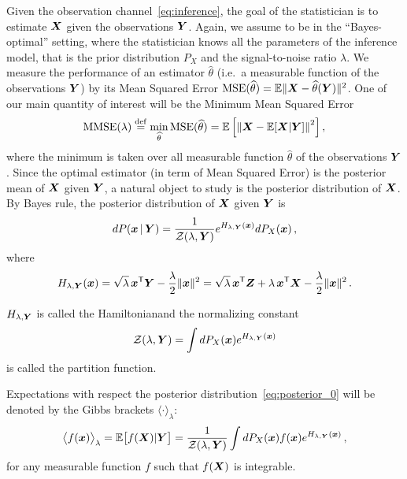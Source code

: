 \documentclass[12pt,nocut]{article}
\begin{document}
Given the observation channel~\eqref{eq:inference}, the goal of the statistician is to estimate ${\boldsymbol X}$ given the observations ${\boldsymbol Y}$. Again, we assume to be in the ``Bayes-optimal'' setting, where the statistician knows all the parameters of the inference model, that is the prior distribution $P_X$ and the signal-to-noise ratio $\lambda$. We measure the performance of an estimator $\widehat{\theta}$ (i.e.\ a measurable function of the observations ${\boldsymbol Y}$) by its Mean Squared Error ${{\rm MSE}}(\widehat{\theta}) = \mathbb{E} \| {\boldsymbol X} - \widehat{\theta}({\boldsymbol Y}) \|^2$.
One of our main quantity of interest will be the Minimum Mean Squared Error
$$
{{\rm MMSE}}(\lambda) \overset{{\rm def}}{=} \min_{\widehat{\theta}} {{\rm MSE}}(\widehat{\theta}) = \mathbb{E} \left[ \left\| {\boldsymbol X} - \mathbb{E}[{\boldsymbol X}|{\boldsymbol Y}] \right\|^2 \right],
$$
where the minimum is taken over all measurable function $\widehat{\theta}$ of the observations ${\boldsymbol Y}$.
Since the optimal estimator (in term of Mean Squared Error) is the posterior mean of ${\boldsymbol X}$ given ${\boldsymbol Y}$, a natural object to study is the posterior distribution of ${\boldsymbol X}$.
By Bayes rule, the posterior distribution of ${\boldsymbol X}$ given ${\boldsymbol Y}$ is
\begin{equation}\label{eq:posterior_0}
	dP( {\boldsymbol x} \, | \, {\boldsymbol Y}  ) 
	= \frac{1}{\mathcal{Z}(\lambda,{\boldsymbol Y})} e^{H_{\lambda,{\boldsymbol Y}}({\boldsymbol x})} dP_X({\boldsymbol x}) \,,
\end{equation}
where 
$$
H_{\lambda,{\boldsymbol Y}}({\boldsymbol x})=
\sqrt{\lambda}\, {\boldsymbol x}^{{\sf T}} {\boldsymbol Y} - \frac{\lambda}{2} \| {\boldsymbol x} \|^2
=
\sqrt{\lambda} \, {\boldsymbol x}^{{\sf T}} {\boldsymbol Z} + \lambda \, {\boldsymbol x}^{{\sf T}} {\boldsymbol X} - \frac{\lambda}{2} \| {\boldsymbol x} \|^2 \,.
$$
\begin{definition}
	$H_{\lambda,{\boldsymbol Y}}$ is called the Hamiltonian\protect\footnotemark and the normalizing constant
	$$
	\mathcal{Z}(\lambda,{\boldsymbol Y}) = \int dP_X({\boldsymbol x}) e^{H_{\lambda,{\boldsymbol Y}}({\boldsymbol x})}
	$$
	is called the partition function. 
\end{definition}
Expectations with respect the posterior distribution~\eqref{eq:posterior_0} will be denoted by the Gibbs brackets $\langle \cdot \rangle_{\lambda}$:
$$
\big\langle f({\boldsymbol x}) \big\rangle_{\lambda}
= \mathbb{E} \big[f({\boldsymbol X})|{\boldsymbol Y} \big]
= \frac{1}{\mathcal{Z}(\lambda,{\boldsymbol Y})} \int dP_X({\boldsymbol x}) f({\boldsymbol x}) e^{H_{\lambda,{\boldsymbol Y}}({\boldsymbol x})} \,,
$$
for any measurable function $f$ such that $f({\boldsymbol X})$ is integrable.
\end{document}

